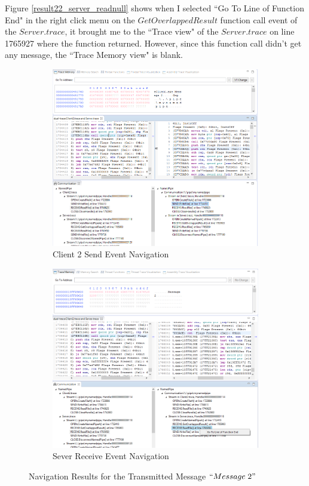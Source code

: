Figure \ref{result22_server_readnull} shows when I selected ``Go To Line of Function End" in the right click menu on the $GetOverlappedResult$ function call event of the $Server.trace$, it brought me to the ``Trace view" of the $Server.trace$ on line 1765927 where the function returned. However, since this function call didn't get any message, the ``Trace Memory view" is blank.

\begin{figure}[H]
\begin{subfigure}[H]{0.45\linewidth}
\includegraphics[scale=0.35]{Figures/result22_client_send}
 \caption{Client 2 Send Event Navigation}
\label{result22_client_send}
\end{subfigure}
\hfill
\begin{subfigure}[H]{0.45\linewidth}
\includegraphics[scale=0.35]{Figures/result22_server_read}
 \caption{Sever Receive Event Navigation}
\label{result22_server_read}
\end{subfigure}%
\caption{Navigation Results for the Transmitted Message $``Message\; 2"$}
\label{result22_client_to_server}
\end{figure}

